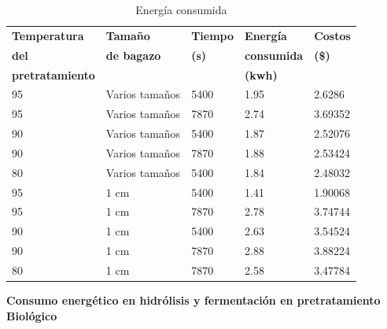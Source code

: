 \documentclass[12pt]{article}
\begin{document}
			
			\begin{table}[H]
				\centering
				\label{energi_}
				\caption{Energía consumida }
					{\fontsize{9}{10.8}\selectfont
				\begin{tabular}{|l|l|l|l|l|}
					\hline
		\textbf{Temperatura} & \textbf{Tamaño } & \textbf{Tiempo} & \textbf{Energía } & \textbf{Costos } \\ 
				\textbf{del} &	\textbf{ de bagazo}  &	\textbf{ (s)} & 	\textbf{consumida  }& 	\textbf{(\$)} \\ 
	\textbf{pretratamiento}  &  &  & \textbf{(kwh)} &  \\ \hline
					95 & Varios  tamaños & 5400 & 1.95 & 2.6286  \\ \hline
					95 & Varios  tamaños & 7870 & 2.74 & 3.69352  \\ \hline
					90 & Varios  tamaños & 5400 & 1.87 & 2.52076  \\ \hline
					90 & Varios  tamaños & 7870 & 1.88 & 2.53424  \\ \hline
					80 & Varios  tamaños & 5400 & 1.84 & 2.48032  \\ \hline
					95 & 1 cm & 5400 & 1.41 & 1.90068  \\ \hline
					95 & 1 cm  & 7870 & 2.78 & 3.74744  \\ \hline
					90 & 1 cm  & 5400 & 2.63 & 3.54524  \\ \hline
					90 & 1 cm  & 7870 & 2.88 & 3.88224  \\ \hline
					80 & 1 cm & 7870 & 2.58 & 3.47784  \\ \hline
				\end{tabular}}

			\end{table}


		


	\textbf{ Consumo energético en hidrólisis y fermentación en pretratamiento Biológico }
	
\end{document}
